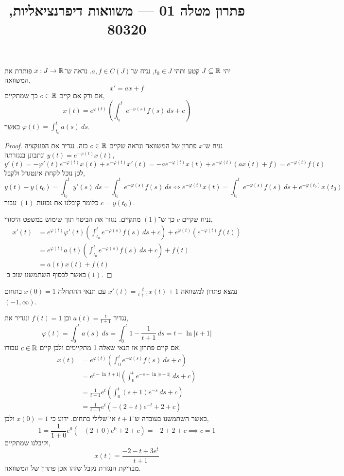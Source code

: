 
\title{פתרון מטלה 01 --- משוואות דיפרנציאליות, 80320}


\maketitle
\maketitleprint[blue]{}

\question{}
יהי $J \subseteq \mathbb{R}$ קטע ותהי $t_0 \in J$, נניח ש־$a, f \in C(J)$.
נראה ש־$x : J \to \mathbb{R}$ פותרת את המשוואה,
\[
	x' = a x + f
\]
אם ורק אם קיים $c \in \mathbb{R}$ כך שמתקיים,
\[
	x(t)
	= e^{\varphi(t)} \left( \int_{t_0}^{t} e^{- \varphi(s)} f(s)\ ds + c \right)
	\tag{1}
\]
כאשר $\varphi(t) = \int_{t_0}^{t} a(s)\ ds$.
\begin{proof}
	נניח ש־$x$ פתרון של המשוואה ונראה שקיים $c \in \mathbb{R}$ כזה.
	נגדיר את הפונקציה $y(t) = e^{- \varphi(t)} x(t)$ ונתבונן בנגזרתה,
	\[
		y'(t)
		= -\varphi'(t) e^{- \varphi(t)} x(t) + e^{- \varphi(t)} x'(t)
		= -a e^{- \varphi(t)} x(t) + e^{- \varphi(t)} (ax(t) + f)
		= e^{- \varphi(t)} f(t)
	\]
	לכן נוכל לקחת אינטגרל ולקבל,
	\[
		y(t) - y(t_0)
		= \int_{t_0}^t y'(s)\ ds
		= \int_{t_0}^t e^{- \varphi(s)} f(s)\ ds
		\iff e^{- \varphi(t)} x(t) = \int_{t_0}^t e^{- \varphi(s)} f(s)\ ds + e^{- \varphi(t_0)} x(t_0)
	\]
	כלומר קיבלנו את נכונות $(1)$ עבור $c = y(t_0)$.

	נניח שקיים $c$ כך ש־$(1)$ מתקיים.
	נגזור את הביטוי תוך שימוש במשפט היסודי,
	\begin{align*}
		x'(t)
		& = e^{\varphi(t)} \varphi'(t) \left( \int_{t_0}^{t} e^{- \varphi(s)} f(s)\ ds + c \right) + e^{\varphi(t)} (e^{-\varphi(t)} f(t)) \\
		& = e^{\varphi(t)} a(t) \left( \int_{t_0}^{t} e^{- \varphi(s)} f(s)\ ds + c \right) + f(t) \\
		& = a(t) x(t) + f(t)
	\end{align*}
	כאשר לבסוף השתמשנו שוב ב־$(1)$.
\end{proof}

\question{}
נמצא פתרון למשוואה $x'(t) = \frac{t}{t + 1} x(t) + 1$ עם תנאי ההתחלה $x(0) = 1$ בתחום $(-1, \infty)$.
\begin{solution}
	נגדיר $a(t) = \frac{t}{t + 1}$ וכן $f(t) = 1$ ונגדיר את,
	\[
		\varphi(t)
		= \int_0^t a(s)\ ds
		= \int_0^t 1 - \frac{1}{t + 1}\ ds
		= t - \ln |t + 1|
	\]
	אם קיים פתרון אז תנאי שאלה 1 מתקיימים ולכן קיים $c \in \mathbb{R}$ עבורו,
	\begin{align*}
		x(t)
		& = e^{\varphi(t)} \left( \int_0^t e^{- \varphi(s)} f(s)\ ds + c \right) \\
		& = e^{t - \ln |t + 1|} \left( \int_0^t e^{- s + \ln |s + 1|}\ ds + c \right) \\
		& = \frac{1}{t + 1} e^t \left( \int_0^t (s + 1) e^{-s}\ ds + c \right) \\
		& = \frac{1}{t + 1} e^t \left( -(2 + t) e^{-t} + 2 + c \right)
	\end{align*}
	כאשר השתמשנו בעובדה ש־$t + 1$ אי־שלילי בתחום.
	ידוע כי $x(0) = 1$ ולכן,
	\[
		1 = \frac{1}{1 + 0} e^0 ( -(2 + 0) e^{0} + 2 + c)
		= -2 + 2 + c
		\implies c = 1
	\]
	וקיבלנו שמתקיים,
	\[
		x(t)
		= \frac{-2 - t + 3 e^t}{t + 1}
	\]
	מבדיקת הנגזרת נקבל שזהו אכן פתרון של המשוואה.
\end{solution}

